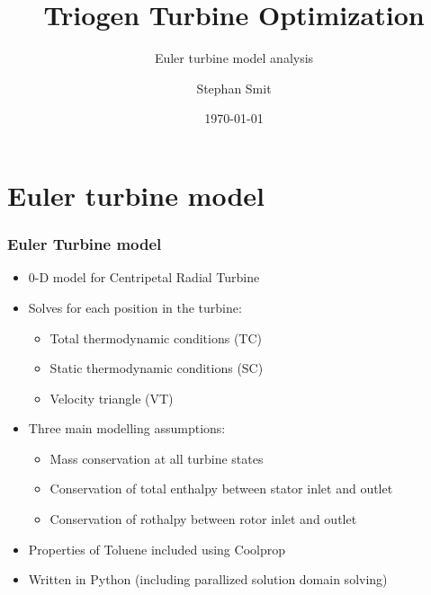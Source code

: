 \documentclass{beamer}
\title[Triogen Turbine Optimization]{Triogen Turbine Optimization}
\subtitle[Analysis]{Euler turbine model analysis}
\institute[TU Delft]{Delft University of Technology}
\author{Stephan Smit}
\date{\today}
\begin{document}
{
%
\frame{\titlepage}
}



\section{Euler turbine model }

\begin{frame}
	\frametitle{Euler Turbine model }
	\begin{itemize}
		\item  0-D model for Centripetal Radial Turbine
		\item Solves for each position in the turbine:
		\begin{itemize}
			\item  Total thermodynamic conditions (TC)
			\item  Static thermodynamic conditions (SC)
			\item  Velocity triangle (VT)
		\end{itemize}	
		\item  Three main modelling assumptions:
		\begin{itemize}
			\item  Mass conservation at all turbine states
			\item  Conservation of total enthalpy between stator inlet and outlet
			\item  Conservation of rothalpy between rotor inlet and outlet
		\end{itemize}
		\item  Properties of Toluene included using Coolprop
		\item  Written in Python (including parallized solution domain solving)
	\end{itemize}
\end{frame}
\end{document}
